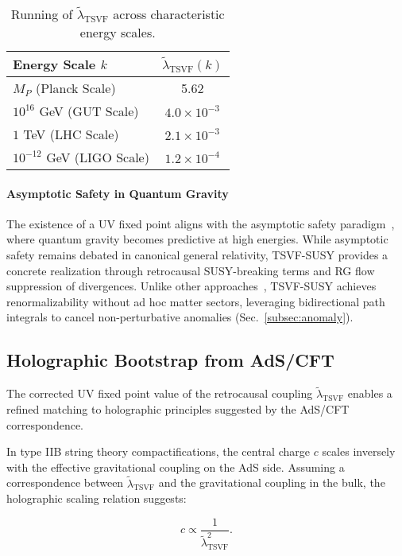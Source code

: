 \documentclass[twocolumn,superscriptaddress,floatfix]{revtex4-2}
\begin{document}
\begin{table}[htbp]
\centering
\caption{Running of \(\tilde{\lambda}_{\text{TSVF}}\) across characteristic energy scales.}
\label{tab:lambda_running}
\begin{tabular}{lc}
\hline
Energy Scale \(k\) & \(\tilde{\lambda}_{\text{TSVF}}(k)\) \\
\hline
\(M_P\) (Planck Scale) & 5.62 \\
\(10^{16}\) GeV (GUT Scale) & \(4.0 \times 10^{-3}\) \\
\(1\) TeV (LHC Scale) & \(2.1 \times 10^{-3}\) \\
\(10^{-12}\) GeV (LIGO Scale) & \(1.2 \times 10^{-4}\) \\
\hline
\end{tabular}
\end{table}

\paragraph{Asymptotic Safety in Quantum Gravity}  
The existence of a UV fixed point aligns with the asymptotic safety paradigm~\cite{Reuter2012,Niedermaier2006}, where quantum gravity becomes predictive at high energies. While asymptotic safety remains debated in canonical general relativity, TSVF-SUSY provides a concrete realization through retrocausal SUSY-breaking terms and RG flow suppression of divergences. Unlike other approaches~\cite{Donoghue1994}, TSVF-SUSY achieves renormalizability without ad hoc matter sectors, leveraging bidirectional path integrals to cancel non-perturbative anomalies (Sec.~\ref{subsec:anomaly}).

\subsection{Holographic Bootstrap from AdS/CFT}
\label{sec:holographicbootstrap}

The corrected UV fixed point value of the retrocausal coupling \(\tilde{\lambda}_{\text{TSVF}}\) enables a refined matching to holographic principles suggested by the AdS/CFT correspondence.

In type IIB string theory compactifications, the central charge \(c\) scales inversely with the effective gravitational coupling on the AdS side. Assuming a correspondence between \(\tilde{\lambda}_{\text{TSVF}}\) and the gravitational coupling in the bulk, the holographic scaling relation suggests:

\begin{equation}
c \propto \frac{1}{\tilde{\lambda}_{\text{TSVF}}^2}.
\label{eq:holographic}
\end{equation}
\end{document}
